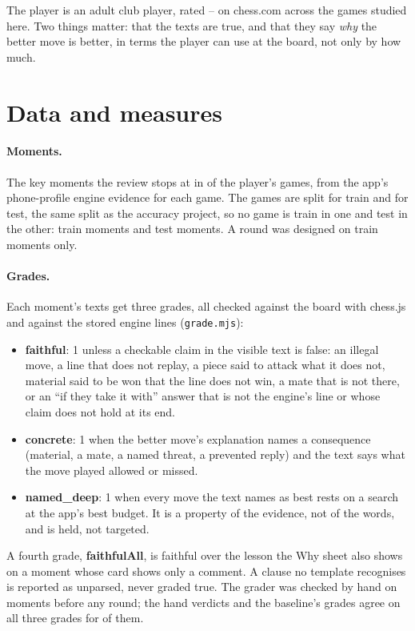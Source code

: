 \documentclass[11pt]{article}
\begin{document}
The player is an adult club player, rated \PlayerRatingMin--\PlayerRatingMax{} on chess.com across the
\Games{} games studied here. Two things matter: that the texts are true, and that they say
\emph{why} the better move is better, in terms the player can use at the board, not only by how
much.

\section{Data and measures}

\paragraph{Moments.} The \Moments{} key moments the review stops at in \Games{} of the player's
games, from the app's phone-profile engine evidence for each game. The games are split
\GamesTrain{} for train and \GamesTest{} for test, the same split as the accuracy project, so no
game is train in one and test in the other: \MomentsTrain{} train moments and \MomentsTest{}
test moments. A round was designed on train moments only.

\paragraph{Grades.} Each moment's texts get three grades, all checked against the board with
chess.js and against the stored engine lines (\texttt{grade.mjs}):

\begin{itemize}[nosep]
\item \textbf{faithful}: 1 unless a checkable claim in the visible text is false: an illegal
move, a line that does not replay, a piece said to attack what it does not, material said to
be won that the line does not win, a mate that is not there, or an ``if they take it with''
answer that is not the engine's line or whose claim does not hold at its end.
\item \textbf{concrete}: 1 when the better move's explanation names a consequence (material, a
mate, a named threat, a prevented reply) and the text says what the move played allowed or
missed.
\item \textbf{named\_deep}: 1 when every move the text names as best rests on a search at the
app's best budget. It is a property of the evidence, not of the words, and is held, not
targeted.
\end{itemize}

A fourth grade, \textbf{faithfulAll}, is faithful over the lesson the Why sheet also shows on a
moment whose card shows only a comment. A clause no template recognises is reported as
unparsed, never graded true. The grader was checked by hand on \HandcheckMoments{} moments
before any round; the hand verdicts and the baseline's grades agree on all three grades for
\HandcheckAgree{} of them.
\end{document}
